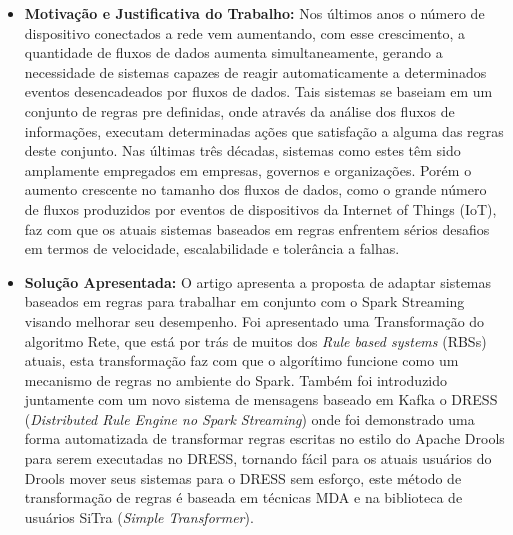 \documentclass[tid,table]{texufpel} %
\begin{document}
\begin{itemize}
	\item \textbf{Motivação e Justificativa do Trabalho:} Nos últimos anos o número de dispositivo conectados a rede vem aumentando, com esse crescimento, a quantidade de fluxos de dados aumenta simultaneamente, gerando a necessidade de sistemas capazes de reagir automaticamente a determinados eventos desencadeados por fluxos de dados. Tais sistemas se baseiam em um conjunto de regras pre definidas, onde através da análise dos fluxos de informações, executam determinadas ações que satisfação a alguma das regras deste conjunto. Nas últimas três décadas, sistemas como estes têm sido amplamente empregados em empresas, governos e organizações. Porém o aumento crescente no tamanho dos fluxos de dados, como o grande número de fluxos produzidos por eventos de dispositivos da Internet of Things (IoT), faz com que os atuais sistemas baseados em regras enfrentem sérios desafios em termos de velocidade, escalabilidade e tolerância a falhas.
	
	\item \textbf{Solução Apresentada:} O artigo apresenta a proposta de adaptar sistemas baseados em regras para trabalhar em conjunto com o Spark Streaming visando melhorar seu desempenho. Foi apresentado uma Transformação do algoritmo Rete, que está por trás de muitos dos \textit{Rule based systems} (RBSs) atuais, esta transformação faz com que o algorítimo funcione como um mecanismo de regras no ambiente do Spark. Também foi introduzido juntamente com um novo sistema de mensagens baseado em Kafka o DRESS (\textit{Distributed Rule Engine no Spark Streaming}) onde foi demonstrado uma forma automatizada de transformar regras escritas no estilo do Apache Drools para serem executadas no DRESS, tornando fácil para os atuais usuários do Drools mover seus sistemas para o DRESS sem esforço, este método de transformação de regras é baseada em técnicas MDA e na biblioteca de usuários SiTra (\textit{Simple Transformer}).
	

\end{itemize}
\end{document}
